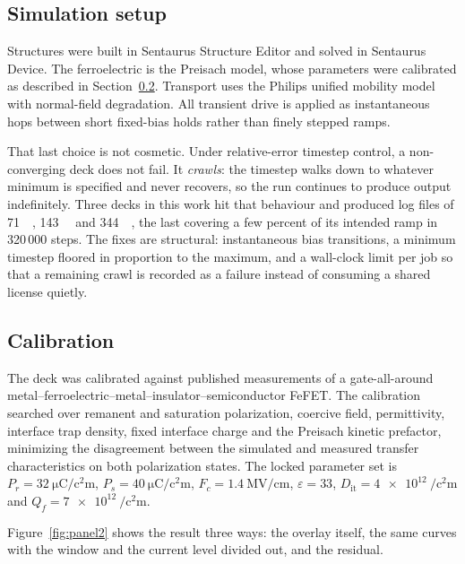 \subsection{Simulation setup}

Structures were built in Sentaurus Structure Editor and solved in Sentaurus Device.
The ferroelectric is the Preisach model, whose parameters were calibrated as described
in Section~\ref{sec:cal}. Transport uses the Philips unified mobility model with normal-field
degradation. All transient drive is applied as instantaneous hops between short
fixed-bias holds rather than finely stepped ramps.

That last choice is not cosmetic. Under relative-error timestep control, a
non-converging deck does not fail. It \emph{crawls}: the timestep walks down to
whatever minimum is specified and never recovers, so the run continues to produce
output indefinitely. Three decks in this work hit that behaviour and produced log
files of \SI{71}{\mega\byte}, \SI{143}{\mega\byte} and \SI{344}{\mega\byte}, the last
covering a few percent of its intended ramp in 320\,000 steps. The fixes are
structural: instantaneous bias transitions, a minimum timestep floored in proportion
to the maximum, and a wall-clock limit per job so that a remaining crawl is recorded
as a failure instead of consuming a shared license quietly.

\subsection{Calibration}
\label{sec:cal}

The deck was calibrated against published measurements of a gate-all-around
metal--ferroelectric--metal--insulator--semiconductor FeFET. The calibration searched
over remanent and saturation polarization, coercive field, permittivity, interface trap
density, fixed interface charge and the Preisach kinetic prefactor, minimizing the
disagreement between the simulated and measured transfer characteristics on both
polarization states. The locked parameter set is
$P_r=\SI{32}{\micro\coulomb\per\square\centi\metre}$,
$P_s=\SI{40}{\micro\coulomb\per\square\centi\metre}$,
$F_c=\SI{1.4}{\mega\volt\per\centi\metre}$, $\varepsilon=33$,
$D_\mathrm{it}=\SI{4e12}{\per\square\centi\metre}$ and
$Q_f=\SI{7e12}{\per\square\centi\metre}$.

Figure~\ref{fig:panel2} shows the result three ways: the overlay itself, the same curves with the
window and the current level divided out, and the residual.

